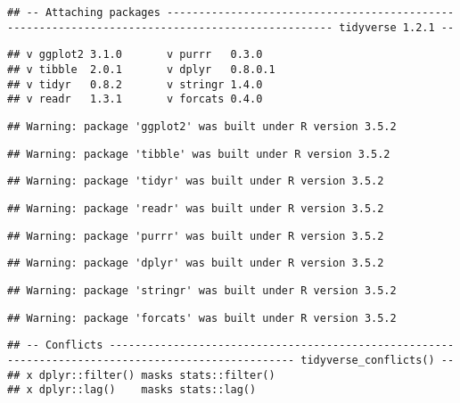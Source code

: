\documentclass[]{article}
\begin{document}
\begin{verbatim}
## -- Attaching packages ------------------------------------------------------------------------------------------------ tidyverse 1.2.1 --
\end{verbatim}

\begin{verbatim}
## v ggplot2 3.1.0       v purrr   0.3.0  
## v tibble  2.0.1       v dplyr   0.8.0.1
## v tidyr   0.8.2       v stringr 1.4.0  
## v readr   1.3.1       v forcats 0.4.0
\end{verbatim}

\begin{verbatim}
## Warning: package 'ggplot2' was built under R version 3.5.2
\end{verbatim}

\begin{verbatim}
## Warning: package 'tibble' was built under R version 3.5.2
\end{verbatim}

\begin{verbatim}
## Warning: package 'tidyr' was built under R version 3.5.2
\end{verbatim}

\begin{verbatim}
## Warning: package 'readr' was built under R version 3.5.2
\end{verbatim}

\begin{verbatim}
## Warning: package 'purrr' was built under R version 3.5.2
\end{verbatim}

\begin{verbatim}
## Warning: package 'dplyr' was built under R version 3.5.2
\end{verbatim}

\begin{verbatim}
## Warning: package 'stringr' was built under R version 3.5.2
\end{verbatim}

\begin{verbatim}
## Warning: package 'forcats' was built under R version 3.5.2
\end{verbatim}

\begin{verbatim}
## -- Conflicts --------------------------------------------------------------------------------------------------- tidyverse_conflicts() --
## x dplyr::filter() masks stats::filter()
## x dplyr::lag()    masks stats::lag()
\end{verbatim}
\end{document}
